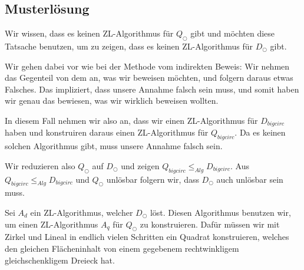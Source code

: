 \documentclass[
	12pt, %
	german, %
]{fphw}
\begin{document}

\subsection*{Musterlösung}

Wir wissen, dass es keinen ZL-Algorithmus für \(Q_{\bigcirc}\) gibt und möchten diese Tatsache benutzen, um zu zeigen, dass es keinen ZL-Algorithmus für \(D_{\bigcirc}\) gibt.

Wir gehen dabei vor wie bei der Methode vom indirekten Beweis: Wir nehmen das Gegenteil von dem an, was wir beweisen möchten, und folgern daraus etwas Falsches. Das impliziert, dass unsere Annahme falsch sein muss, und somit haben wir genau das bewiesen, was wir wirklich beweisen wollten.

In diesem Fall nehmen wir also an, dass wir einen ZL-Algorithmus für \(D_{bigcirc}\) haben und konstruiren daraus einen ZL-Algorithmus für \(Q_{bigcirc}\). Da es keinen solchen Algorithmus gibt, muss unsere Annahme falsch sein.

Wir reduzieren also \(Q_{\bigcirc}\) auf \(D_{\bigcirc}\) und zeigen \(Q_{bigcirc} \leq_{Alg} D_{bigcirc}\). Aus \(Q_{bigcirc} \leq_{Alg} D_{bigcirc}\) und \(Q_{\bigcirc}\) unlösbar folgern wir, dass \(D_{\bigcirc}\) auch unlösbar sein muss.

Sei \(A_d\) ein ZL-Algorithmus, welcher \(D_{\bigcirc}\) löst. Diesen Algorithmus benutzen wir, um einen ZL-Algorithmus \(A_q\) für \(Q_{\bigcirc}\) zu konstruieren. Dafür müssen wir mit Zirkel und Lineal in endlich vielen Schritten ein Quadrat konstruieren, welches den gleichen Flächeninhalt von einem gegebenem rechtwinkligem gleichschenkligem Dreieck hat.
\end{document}
